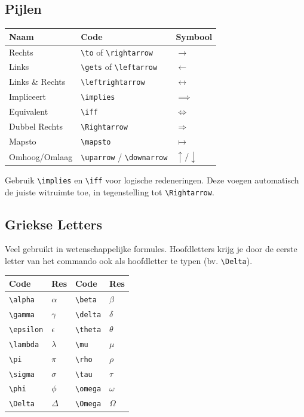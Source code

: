 \documentclass[a4paper,11pt]{article}
\begin{document}
\subsection{Pijlen}
\begin{tabular}{lll}
\toprule
\textbf{Naam} & \textbf{Code} & \textbf{Symbool} \\
\midrule
Rechts & \verb|\to| of \verb|\rightarrow| & $\to$ \\
Links & \verb|\gets| of \verb|\leftarrow| & $\gets$ \\
Links \& Rechts & \verb|\leftrightarrow| & $\leftrightarrow$ \\
Impliceert & \verb|\implies| & $\implies$ \\
Equivalent & \verb|\iff| & $\iff$ \\
Dubbel Rechts & \verb|\Rightarrow| & $\Rightarrow$ \\
Mapsto & \verb|\mapsto| & $\mapsto$ \\
Omhoog/Omlaag & \verb|\uparrow| / \verb|\downarrow| & $\uparrow / \downarrow$ \\
\bottomrule
\end{tabular}

\begin{examenbox}
Gebruik \verb|\implies| en \verb|\iff| voor logische redeneringen. Deze voegen automatisch de juiste witruimte toe, in tegenstelling tot \verb|\Rightarrow|.
\end{examenbox}

\subsection{Griekse Letters}
Veel gebruikt in wetenschappelijke formules. Hoofdletters krijg je door de eerste letter van het commando ook als hoofdletter te typen (bv. \verb|\Delta|).

\begin{tabular}{llll}
\toprule
Code & Res & Code & Res \\
\midrule
\verb|\alpha| & $\alpha$ & \verb|\beta| & $\beta$ \\
\verb|\gamma| & $\gamma$ & \verb|\delta| & $\delta$ \\
\verb|\epsilon| & $\epsilon$ & \verb|\theta| & $\theta$ \\
\verb|\lambda| & $\lambda$ & \verb|\mu| & $\mu$ \\
\verb|\pi| & $\pi$ & \verb|\rho| & $\rho$ \\
\verb|\sigma| & $\sigma$ & \verb|\tau| & $\tau$ \\
\verb|\phi| & $\phi$ & \verb|\omega| & $\omega$ \\
\verb|\Delta| & $\Delta$ & \verb|\Omega| & $\Omega$ \\
\bottomrule
\end{tabular}
\end{document}
